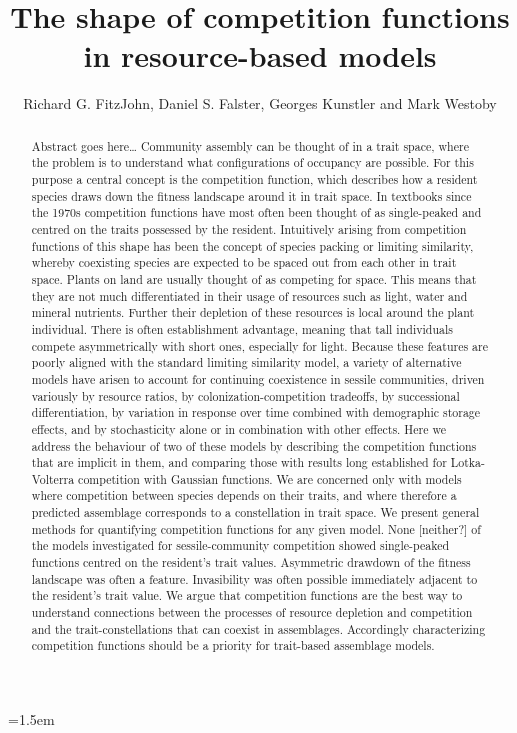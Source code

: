 \documentclass[a4paper,11pt]{article}
\title{The shape of competition functions in resource-based models}
\author{Richard G. FitzJohn, Daniel S. Falster, Georges Kunstler and Mark Westoby}
\date{}
\affiliation{Department of Biological Sciences, Macquarie University,
  Sydney, Australia}
\begin{document}

\mstitlepage
\parindent=1.5em
\addtolength{\parskip}{.3em}

\begin{abstract}
Abstract goes here\ldots
Community assembly can be thought of in a trait space, where the problem is to understand what configurations of occupancy are possible. For this purpose a central concept is the competition function, which describes how a resident species draws down the fitness landscape around it in trait space. In textbooks since the 1970s competition functions have most often been thought of as single-peaked and centred on the traits possessed by the resident. Intuitively arising from competition functions of this shape has been the concept of species packing or limiting similarity, whereby coexisting species are expected to be spaced out from each other in trait space.
Plants on land are usually thought of as competing for space. This means that they are not much differentiated in their usage of resources such as light, water and mineral nutrients. Further their depletion of these resources is local around the plant individual. There is often establishment advantage, meaning that tall individuals compete asymmetrically with short ones, especially for light. Because these features are poorly aligned with the standard limiting similarity model, a variety of alternative models have arisen to account for continuing coexistence in sessile communities, driven variously by resource ratios, by colonization-competition tradeoffs, by successional differentiation, by variation in response over time combined with demographic storage effects, and by stochasticity alone or in combination with other effects.
Here we address the behaviour of two of these models by describing the competition functions that are implicit in them, and comparing those with results long established for Lotka-Volterra competition with Gaussian functions. We are concerned only with models where competition between species depends on their traits, and where therefore a predicted assemblage corresponds to a constellation in trait space. We present general methods for quantifying competition functions for any given model.
None [neither?] of the models investigated for sessile-community competition showed single-peaked functions centred on the resident's trait values. Asymmetric drawdown of the fitness landscape was often a feature. Invasibility was often possible immediately adjacent to the resident's trait value. We argue that competition functions are the best way to understand connections between the processes of resource depletion and competition and the trait-constellations that can coexist in assemblages. Accordingly characterizing competition functions should be a priority for trait-based assemblage models.

\end{abstract}
\end{document}

